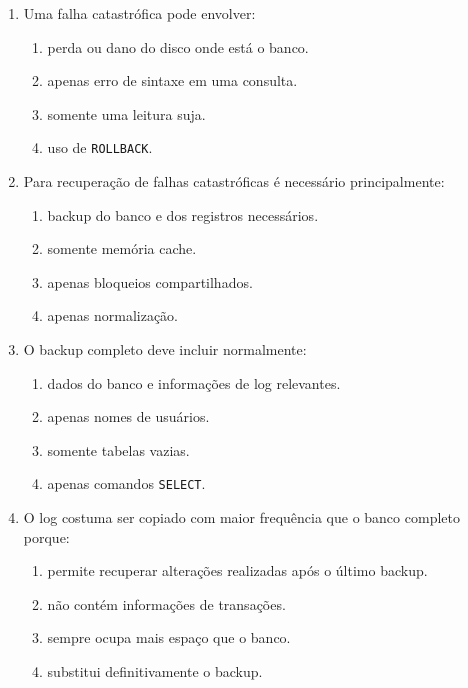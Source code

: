 \documentclass[12pt,a4paper]{article}
\begin{document}
\begin{enumerate}[label=\textbf{Q\arabic*.}]
\item Uma falha catastrófica pode envolver:

\begin{enumerate}[label=\alph*)]
    \item perda ou dano do disco onde está o banco.
    \item apenas erro de sintaxe em uma consulta.
    \item somente uma leitura suja.
    \item uso de \texttt{ROLLBACK}.
\end{enumerate}

\item Para recuperação de falhas catastróficas é necessário principalmente:

\begin{enumerate}[label=\alph*)]
    \item backup do banco e dos registros necessários.
    \item somente memória cache.
    \item apenas bloqueios compartilhados.
    \item apenas normalização.
\end{enumerate}

\item O backup completo deve incluir normalmente:

\begin{enumerate}[label=\alph*)]
    \item dados do banco e informações de log relevantes.
    \item apenas nomes de usuários.
    \item somente tabelas vazias.
    \item apenas comandos \texttt{SELECT}.
\end{enumerate}

\item O log costuma ser copiado com maior frequência que o banco completo porque:

\begin{enumerate}[label=\alph*)]
    \item permite recuperar alterações realizadas após o último backup.
    \item não contém informações de transações.
    \item sempre ocupa mais espaço que o banco.
    \item substitui definitivamente o backup.
\end{enumerate}


\end{enumerate}
\end{document}
